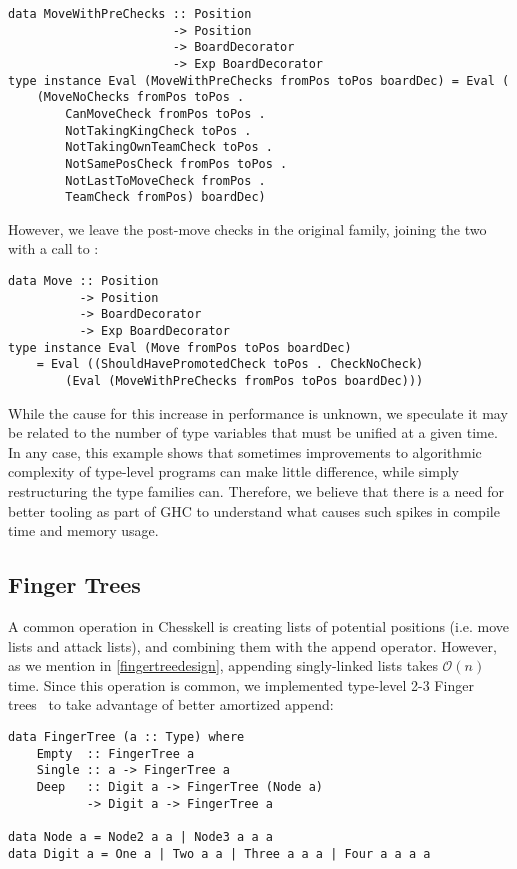 \begin{lstlisting}
data MoveWithPreChecks :: Position
                       -> Position
                       -> BoardDecorator
                       -> Exp BoardDecorator
type instance Eval (MoveWithPreChecks fromPos toPos boardDec) = Eval (
    (MoveNoChecks fromPos toPos .
        CanMoveCheck fromPos toPos .
        NotTakingKingCheck toPos .
        NotTakingOwnTeamCheck toPos .
        NotSamePosCheck fromPos toPos .
        NotLastToMoveCheck fromPos .
        TeamCheck fromPos) boardDec)
\end{lstlisting}

However, we leave the post-move checks in the original  family, joining the two with a call to :

\begin{lstlisting}
data Move :: Position
          -> Position
          -> BoardDecorator
          -> Exp BoardDecorator
type instance Eval (Move fromPos toPos boardDec)
    = Eval ((ShouldHavePromotedCheck toPos . CheckNoCheck)
        (Eval (MoveWithPreChecks fromPos toPos boardDec)))
\end{lstlisting}

While the cause for this increase in performance is unknown, we speculate it may be related to the number of type variables that must be unified at a given time. In any case, this example shows that sometimes improvements to algorithmic complexity of type-level programs can make little difference, while simply restructuring the type families can. Therefore, we believe that there is a need for better tooling as part of GHC to understand what causes such spikes in compile time and memory usage.

\subsection{Finger Trees} \label{fingertreesection}

A common operation in Chesskell is creating lists of potential positions (i.e. move lists and attack lists), and combining them with the append \inline{(++)} operator. However, as we mention in \cref{fingertreedesign}, appending singly-linked lists takes $\mathcal{O}(n)$ time. Since this operation is common, we implemented type-level 2-3 Finger trees~\cite{fingertrees} to take advantage of better amortized append:

\begin{lstlisting}
data FingerTree (a :: Type) where
    Empty  :: FingerTree a
    Single :: a -> FingerTree a
    Deep   :: Digit a -> FingerTree (Node a) 
           -> Digit a -> FingerTree a

data Node a = Node2 a a | Node3 a a a
data Digit a = One a | Two a a | Three a a a | Four a a a a
\end{lstlisting}

